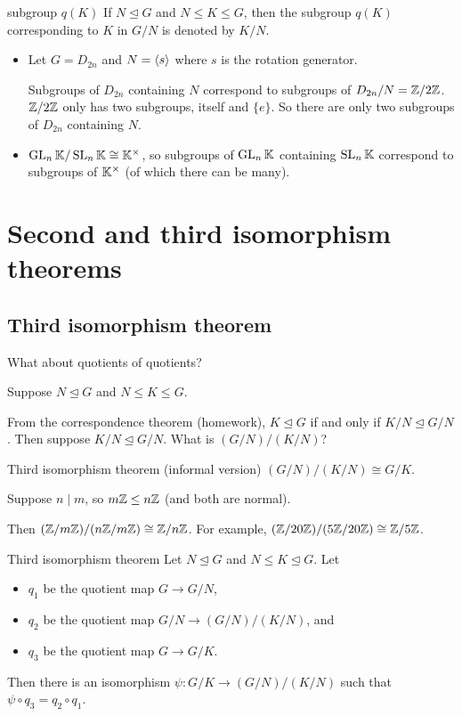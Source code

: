 \documentclass[12pt,letterpaper]{report}
\begin{document}
\begin{defn}{subgroup $q(K)$}{}
  If $N \trianglelefteq G$ and $N \leq K \leq G$, then the subgroup $q(K)$ corresponding to $K$ in
  $G/N$ is denoted by $K/N$.
\end{defn}

\begin{ex}
  \begin{itemize}
    \item Let $G = D_{2n}$ and $N = \langle s\rangle$ where $s$ is the rotation generator.

    Subgroups of $D_{2n}$ containing $N$ correspond to subgroups of $D_{2n}/N = \mathbb{Z}/{2}\mathbb{Z}$.
    $\mathbb{Z}/{2}\mathbb{Z}$ only has two subgroups, itself and $\{e\}$.
    So there are only two subgroups of $D_{2n}$ containing $N$.
    \item
    $\operatorname{GL}_n\mathbb{K}/\operatorname{SL}_n\mathbb{K} \cong \mathbb{K}^\times$, so subgroups of $\operatorname{GL}_n\mathbb{K}$
    containing $\operatorname{SL}_n\mathbb{K}$ correspond to subgroups of $\mathbb{K}^\times$ (of which there
    can be many).
  \end{itemize}
\end{ex}

\section{Second and third isomorphism theorems}

\subsection{Third isomorphism theorem}

What about quotients of quotients?

Suppose $N \trianglelefteq G$ and $N \leq K \leq G$.

From the correspondence theorem (homework), $K \trianglelefteq G$ if and only if
$K/N \trianglelefteq G/N$.
Then suppose $K/N \trianglelefteq G/N$.
What is $(G/N)/(K/N)$?

\begin{thm}{Third isomorphism theorem (informal version)}{}
  $(G/N)/(K/N) \cong G/K$.
\end{thm}

\begin{ex}
  Suppose $n \mid m$, so $m\mathbb{Z} \leq n\mathbb{Z}$ (and both are normal).

  Then $(\mathbb{Z}/m\mathbb{Z})/(n\mathbb{Z}/m\mathbb{Z}) \cong \mathbb{Z}/n\mathbb{Z}$.
  For example, $(\mathbb{Z}/20\mathbb{Z})/(5\mathbb{Z}/20\mathbb{Z}) \cong \mathbb{Z}/5\mathbb{Z}$.
\end{ex}

\begin{thm}{Third isomorphism theorem}{}
  Let $N \trianglelefteq G$ and $N \leq K \trianglelefteq G$.
  Let
  \begin{itemize}
    \item $q_1$ be the quotient map $G \to G/N$,
    \item $q_2$ be the quotient map $G/N \to (G/N)/(K/N)$, and
    \item $q_3$ be the quotient map $G \to G/K$.
  \end{itemize}
  Then there is an isomorphism $\psi \colon G/K \to (G/N)/(K/N)$ such that
  $\psi \circ q_3 = q_2 \circ q_1$.
\end{thm}
\end{document}

